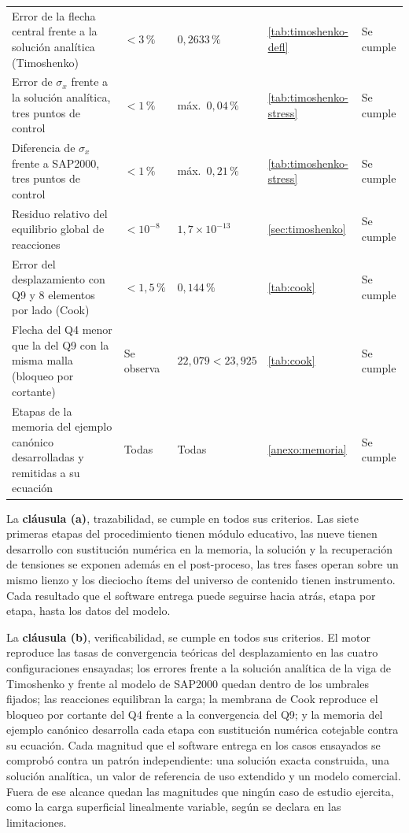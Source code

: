 {\begin{longtable}{@{}>{\raggedright\arraybackslash}p{4.2cm}>{\raggedright\arraybackslash}p{2.5cm}>{\raggedright\arraybackslash}p{3.5cm}>{\raggedright\arraybackslash}p{2.6cm}>{\raggedright\arraybackslash}p{1.9cm}@{}}
Error de la flecha central frente a la solución analítica (Timoshenko) & $< 3\,\%$ & $0{,}2633\,\%$ & \autoref{tab:timoshenko-defl} & Se cumple \\
Error de $\sigma_x$ frente a la solución analítica, tres puntos de control & $< 1\,\%$ & máx.\ $0{,}04\,\%$ & \autoref{tab:timoshenko-stress} & Se cumple \\
Diferencia de $\sigma_x$ frente a SAP2000, tres puntos de control & $< 1\,\%$ & máx.\ $0{,}21\,\%$ & \autoref{tab:timoshenko-stress} & Se cumple \\
Residuo relativo del equilibrio global de reacciones & $< 10^{-8}$ & $1{,}7\times10^{-13}$ & \autoref{sec:timoshenko} & Se cumple \\
Error del desplazamiento con Q9 y 8 elementos por lado (Cook) & $< 1{,}5\,\%$ & $0{,}144\,\%$ & \autoref{tab:cook} & Se cumple \\
Flecha del Q4 menor que la del Q9 con la misma malla (bloqueo por cortante) & Se observa & $22{,}079 < 23{,}925$ & \autoref{tab:cook} & Se cumple \\
Etapas de la memoria del ejemplo canónico desarrolladas y remitidas a su ecuación & Todas & Todas & \autoref{anexo:memoria} & Se cumple \\
\end{longtable}}

La \textbf{cláusula (a)}, trazabilidad, se cumple en todos sus criterios. Las siete primeras etapas del procedimiento tienen módulo educativo, las nueve tienen desarrollo con sustitución numérica en la memoria, la solución y la recuperación de tensiones se exponen además en el post-proceso, las tres fases operan sobre un mismo lienzo y los dieciocho ítems del universo de contenido tienen instrumento. Cada resultado que el software entrega puede seguirse hacia atrás, etapa por etapa, hasta los datos del modelo.

La \textbf{cláusula (b)}, verificabilidad, se cumple en todos sus criterios. El motor reproduce las tasas de convergencia teóricas del desplazamiento en las cuatro configuraciones ensayadas; los errores frente a la solución analítica de la viga de Timoshenko y frente al modelo de SAP2000 quedan dentro de los umbrales fijados; las reacciones equilibran la carga; la membrana de Cook reproduce el bloqueo por cortante del Q4 frente a la convergencia del Q9; y la memoria del ejemplo canónico desarrolla cada etapa con sustitución numérica cotejable contra su ecuación. Cada magnitud que el software entrega en los casos ensayados se comprobó contra un patrón independiente: una solución exacta construida, una solución analítica, un valor de referencia de uso extendido y un modelo comercial. Fuera de ese alcance quedan las magnitudes que ningún caso de estudio ejercita, como la carga superficial linealmente variable, según se declara en las limitaciones.

